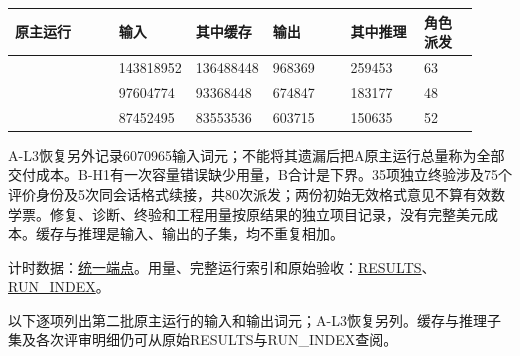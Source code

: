 \begingroup\small\setlength{\tabcolsep}{3pt}\renewcommand{\arraystretch}{1.14}
\par\nopagebreak\medskip\noindent\begin{minipage}[t]{\linewidth}
\begin{tabular}{>{\raggedright\arraybackslash}p{0.23\linewidth}>{\raggedright\arraybackslash}p{0.11\linewidth}>{\raggedright\arraybackslash}p{0.13\linewidth}>{\raggedright\arraybackslash}p{0.17\linewidth}>{\raggedright\arraybackslash}p{0.16\linewidth}>{\raggedright\arraybackslash}p{0.12\linewidth}}
\toprule
\textbf{原主运行} & \textbf{输入} & \textbf{其中缓存} & \textbf{输出} & \textbf{其中推理} & \textbf{角色派发}\\\midrule

{A} & {143818952} & {136488448} & {968369} & {259453} & {63}\\
{B} & {97604774} & {93368448} & {674847} & {183177} & {48}\\
{C} & {87452495} & {83553536} & {603715} & {150635} & {52}\\
\bottomrule\end{tabular}\end{minipage}\par\medskip\endgroup
A-L3恢复另外记录6070965输入词元；不能将其遗漏后把A原主运行总量称为全部交付成本。B-H1有一次容量错误缺少用量，B合计是下界。35项独立终验涉及75个评价身份及5次同会话格式续接，共80次派发；两份初始无效格式意见不算有效数学票。修复、诊断、终验和工程用量按原结果的独立项目记录，没有完整美元成本。缓存与推理是输入、输出的子集，均不重复相加。

计时数据：\href{verification/revision23/stage2_uniform_timing_20260914.json}{统一端点}。用量、完整运行索引和原始验收：\href{verification/revision23/RESULTS.json}{RESULTS}、\href{verification/revision23/RUN_INDEX.csv}{RUN\_INDEX}。

以下逐项列出第二批原主运行的输入和输出词元；A-L3恢复另列。缓存与推理子集及各次评审明细仍可从原始RESULTS与RUN\_INDEX查阅。

